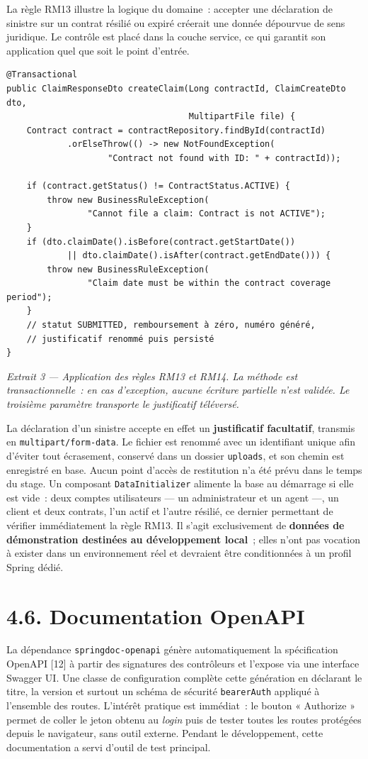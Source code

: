 \documentclass[12pt,a4paper]{report}
\begin{document}
La règle RM13 illustre la logique du domaine~: accepter une déclaration de sinistre sur un contrat résilié ou expiré créerait une donnée dépourvue de sens juridique. Le contrôle est placé dans la couche service, ce qui garantit son application quel que soit le point d'entrée.
\begin{verbatim}
@Transactional
public ClaimResponseDto createClaim(Long contractId, ClaimCreateDto dto,
                                    MultipartFile file) {
    Contract contract = contractRepository.findById(contractId)
            .orElseThrow(() -> new NotFoundException(
                    "Contract not found with ID: " + contractId));

    if (contract.getStatus() != ContractStatus.ACTIVE) {
        throw new BusinessRuleException(
                "Cannot file a claim: Contract is not ACTIVE");
    }
    if (dto.claimDate().isBefore(contract.getStartDate())
            || dto.claimDate().isAfter(contract.getEndDate())) {
        throw new BusinessRuleException(
                "Claim date must be within the contract coverage period");
    }
    // statut SUBMITTED, remboursement à zéro, numéro généré,
    // justificatif renommé puis persisté
}
\end{verbatim}
\begin{center}\textit{Extrait 3 — Application des règles RM13 et RM14. La méthode est transactionnelle~: en cas d'exception, aucune écriture partielle n'est validée. Le troisième paramètre transporte le justificatif téléversé.}\end{center}
La déclaration d'un sinistre accepte en effet un \textbf{justificatif facultatif}, transmis en \texttt{multipart/form-data}. Le fichier est renommé avec un identifiant unique afin d'éviter tout écrasement, conservé dans un dossier \texttt{uploads}, et son chemin est enregistré en base. Aucun point d'accès de restitution n'a été prévu dans le temps du stage.
Un composant \texttt{DataInitializer} alimente la base au démarrage si elle est vide~: deux comptes utilisateurs — un administrateur et un agent —, un client et deux contrats, l'un actif et l'autre résilié, ce dernier permettant de vérifier immédiatement la règle RM13. Il s'agit exclusivement de \textbf{données de démonstration destinées au développement local}~; elles n'ont pas vocation à exister dans un environnement réel et devraient être conditionnées à un profil Spring dédié.
\section*{4.6. Documentation OpenAPI}
La dépendance \texttt{springdoc-openapi} génère automatiquement la spécification OpenAPI [12] à partir des signatures des contrôleurs et l'expose via une interface Swagger UI. Une classe de configuration complète cette génération en déclarant le titre, la version et surtout un schéma de sécurité \texttt{bearerAuth} appliqué à l'ensemble des routes. L'intérêt pratique est immédiat~: le bouton « Authorize » permet de coller le jeton obtenu au \textit{login} puis de tester toutes les routes protégées depuis le navigateur, sans outil externe. Pendant le développement, cette documentation a servi d'outil de test principal.
\end{document}
